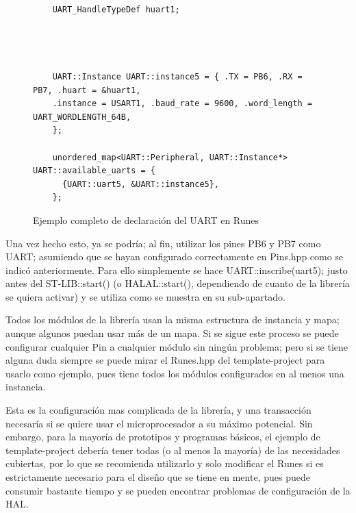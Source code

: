 \documentclass{report}
\begin{document}
\begin{figure}[h]
  \begin{lstlisting}
    UART_HandleTypeDef huart1;




    UART::Instance UART::instance5 = { .TX = PB6, .RX = PB7, .huart = &huart1,
    .instance = USART1, .baud_rate = 9600, .word_length = UART_WORDLENGTH_64B,
    };

    unordered_map<UART::Peripheral, UART::Instance*> UART::available_uarts = {
      {UART::uart5, &UART::instance5},
    };
  \end{lstlisting}
\caption{Ejemplo completo de declaración del UART en Runes}
\label{UARTfullRunes}
\end{figure}
\par \vspace{0.3cm}

Una vez hecho esto, ya se podría; al fin, utilizar los pines PB6 y PB7 como UART; asumiendo que se hayan configurado correctamente en Pins.hpp como se indicó anteriormente. Para ello simplemente se hace UART::inscribe(uart5); justo antes del ST-LIB::start() (o HALAL::start(), dependiendo de cuanto de la librería se quiera activar) y se utiliza como se muestra en su sub-apartado. 
\par \vspace{0.3cm}
Todos los módulos de la librería usan la misma estructura de instancia y mapa; aunque algunos puedan usar más de un mapa. Si se sigue este proceso se puede configurar cualquier Pin a cualquier módulo sin ningún problema; pero si se tiene alguna duda siempre se puede mirar el Runes.hpp del template-project para usarlo como ejemplo, pues tiene todos los módulos configurados en al menos una instancia. 
\par \vspace{0.3cm}
Esta es la configuración mas complicada de la librería, y una transacción necesaría si se quiere usar el microprocesador a su máximo potencial. Sin embargo, para la mayoría de prototipos y programas básicos, el ejemplo de template-project debería tener todas (o al menos la mayoría) de las necesidades cubiertas, por lo que se recomienda utilizarlo y solo modificar el Runes si es estrictamente necesario para el diseño que se tiene en mente, pues puede consumir bastante tiempo y se pueden encontrar problemas de configuración de la HAL. 
\end{document}
